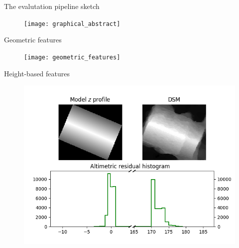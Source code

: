 \documentclass[10pt, export]{beamer}
\begin{document}
        \begin{frame}{The evalutation pipeline sketch}
            \begin{figure}
                \texttt{[image: graphical\_abstract]}
            \end{figure}
        \end{frame}
        \begin{frame}{Geometric features}
            \begin{figure}
                \texttt{[image: geometric\_features]}
            \end{figure}
        \end{frame}
        \begin{frame}{Height-based features}
            \begin{figure}
                \includegraphics[height=.7\textheight]{images/altimetric_features}
            \end{figure}
        \end{frame}
\end{document}
